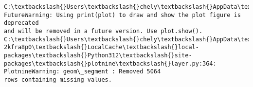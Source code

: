 \documentclass[11pt]{article}
\begin{document}
    \begin{Verbatim}[commandchars=\\\{\}]
C:\textbackslash{}Users\textbackslash{}chely\textbackslash{}AppData\textbackslash{}Local\textbackslash{}Temp\textbackslash{}ipykernel\_20580\textbackslash{}3930044355.py:28:
FutureWarning: Using print(plot) to draw and show the plot figure is deprecated
and will be removed in a future version. Use plot.show().
C:\textbackslash{}Users\textbackslash{}chely\textbackslash{}AppData\textbackslash{}Local\textbackslash{}Packages\textbackslash{}PythonSoftwareFoundation.Python.3.12\_qbz5n
2kfra8p0\textbackslash{}LocalCache\textbackslash{}local-packages\textbackslash{}Python312\textbackslash{}site-
packages\textbackslash{}plotnine\textbackslash{}layer.py:364: PlotnineWarning: geom\_segment : Removed 5064
rows containing missing values.
    \end{Verbatim}

    \begin{center}
    \end{center}
    { \hspace*{\fill} \\}
    
    \begin{Verbatim}[commandchars=\\\{\}]

    \end{Verbatim}
\end{document}
